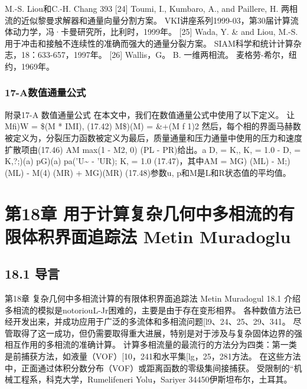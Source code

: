 \documentclass[UTF8,11pt,a4paper,openany,fontset=fandol]{ctexbook}
\begin{document}
M.-S. Liou和C.-H. Chang 393 [24] Toumi, I., Kumbaro, A., and Paillere, H. 两相流的近似黎曼求解器和通量向量分割方案。 VKI讲座系列1999-03，第30届计算流体动力学，冯·卡曼研究所，比利时，1999年。 [25] Wada, Y. \& and Liou, M.-S. 用于冲击和接触不连续性的准确而强大的通量分裂方案。 SIAM科学和统计计算杂志，18：633-657，1997年。 [26] Wallis，G。 B. 一维两相流。 麦格劳-希尔，纽约，1969年。

\subsection{17-A数值通量公式}
附录17-A 数值通量公式 在本文中，我们在数值通量公式中使用了以下定义。 让Mfi)W = \$(M * IMI), (17.42) M\$)(M) = \&+(M f 1)2 然后，每个相的界面马赫数被定义为，分裂压力函数被定义为最后，质量通量和压力通量中使用的压力和速度扩散项由(17.46) AM max(1 - M2, 0) (PL - PR)给出。a D, = K,, K, = 1.0 - D, = K,?;)(a) pG)(a) pa('U\textasciitilde{} - 'UR); K, = 1.0 (17.47)，其中AM = MG) (ML) - M;) (ML) - M(4) (MR) + MG)(MR) (17.48)参数u, p和M是L和R状态值的平均值。

\clearpage
\chapter{第18章 用于计算复杂几何中多相流的有限体积界面追踪法 Metin Muradoglu}
\section{18.1 导言}
第18章 复杂几何中多相流计算的有限体积界面追踪法 Metin Muradogul 18.1 介绍 多相流的模拟是notoriouL-Jr困难的，主要是由于存在变形相界。 各种数值方法已经开发出来，并成功应用于广泛的多流体和多相流问题[l9、24、25、29、341。 尽管取得了这一成功，但仍需要取得重大进展，特别是对于涉及与复杂固体边界的强相互作用的多相流的准确计算。 计算多相流量的最流行的方法分为四类：第一类是前捕获方法，如液量（VOF）[10，241和水平集[lg，25，281方法。 在这些方法中，正面通过体积分数分布（VOF）或距离函数的零级集间接捕获。 受限制的“机械工程系，科克大学，Rumelifeneri Yolu，Sariyer 34450伊斯坦布尔，土耳其。
\end{document}
